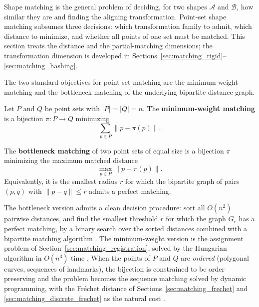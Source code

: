 Shape matching is the general
problem of deciding, for two shapes $\mathcal{A}$ and $\mathcal{B}$, how
similar they are and finding the aligning transformation. Point-set shape
matching subsumes three decisions: which transformation family to admit,
which distance to minimize, and whether all points of one set must be
matched. This section treats the distance and the partial-matching
dimensions; the transformation dimension is developed in
Sections~\ref{sec:matching_rigid}--\ref{sec:matching_hashing}.

The two standard objectives for point-set matching
are the minimum-weight matching and the bottleneck matching of the underlying
bipartite distance graph.

\begin{definition}\label{def:match_min_weight}
  Let $P$ and $Q$ be point sets with $|P| = |Q| = n$. The
  \textbf{minimum-weight matching} is a bijection $\pi \colon P \to Q$
  minimizing
  \[
    \sum_{p \in P} \|p - \pi(p)\| .
  \]
\end{definition}

\begin{definition}\label{def:match_bottleneck}
  The \textbf{bottleneck matching} of two point sets of equal size is a
  bijection $\pi$ minimizing the maximum matched distance
  \[
    \max_{p \in P} \|p - \pi(p)\| .
  \]
  Equivalently, it is the smallest radius $r$ for which the bipartite graph
  of pairs $(p,q)$ with $\|p - q\| \le r$ admits a perfect matching.
\end{definition}

The bottleneck version admits a clean decision procedure: sort all
$O(n^2)$ pairwise distances, and find the smallest threshold $r$ for which
the graph $G_r$ has a perfect matching, by a binary search over the sorted
distances combined with a bipartite matching algorithm
\cite{preparata1985,cormen2009}. The minimum-weight version is the
assignment problem of Section~\ref{sec:matching_registration}, solved by the
Hungarian algorithm in $O(n^3)$ time \cite{kuhn1955,cormen2009}. When the
points of $P$ and $Q$ are \emph{ordered} (polygonal curves, sequences of
landmarks), the bijection is constrained to be order preserving and the
problem becomes the sequence matching solved by dynamic programming, with
the Fr\'echet distance of Sections~\ref{sec:matching_frechet} and
\ref{sec:matching_discrete_frechet} as the natural cost
\cite{alt1995,eiter1994}.

